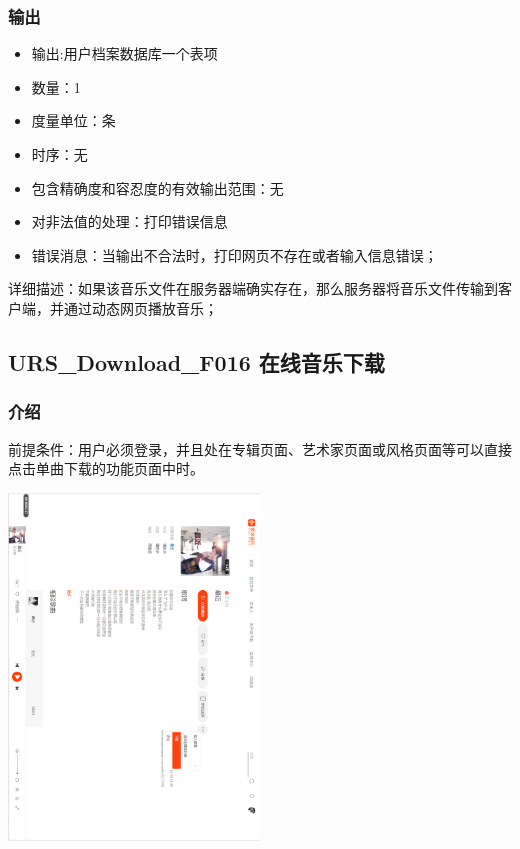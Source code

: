 		 \subsubsection{输出}
		 \begin{itemize}
			 \item	输出:用户档案数据库一个表项
			 \item	数量：1
			 \item	度量单位：条
			 \item	时序：无
			 \item	包含精确度和容忍度的有效输出范围：无
			 \item	对非法值的处理：打印错误信息
			 \item	错误消息：当输出不合法时，打印网页不存在或者输入信息错误；
			\end{itemize}
			详细描述：如果该音乐文件在服务器端确实存在，那么服务器将音乐文件传输到客户端，并通过动态网页播放音乐；




			\subsection{URS\_Download\_F016 在线音乐下载}
			\subsubsection{介绍}
		 
			前提条件：用户必须登录，并且处在专辑页面、艺术家页面或风格页面等可以直接点击单曲下载的功能页面中时。
			\begin{center}
				\begin{sideways} 
			   \includegraphics[width=0.5\textwidth]{./figures/capture18.png} 
				\end{sideways}
			\end{center}
